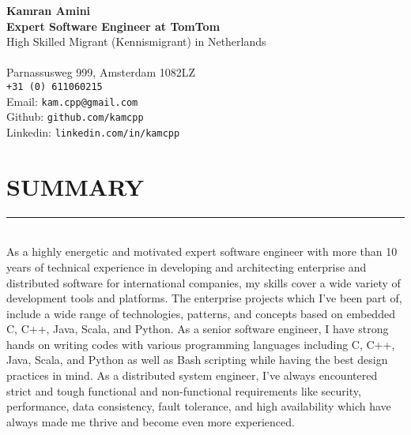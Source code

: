 \documentclass[10pt,a4paper]{article}
\begin{document}
\noindent \textbf{Kamran Amini} \\
\noindent \small \textbf{Expert Software Engineer at TomTom} \\
\noindent \small High Skilled Migrant (Kennismigrant) in Netherlands \\ \\
Parnassusweg 999, Amsterdam 1082LZ \\
\texttt{+31 (0) 611060215} \\
Email: \texttt{kam.cpp@gmail.com} \\
Github: \texttt{github.com/kamcpp} \\
Linkedin: \texttt{linkedin.com/in/kamcpp} 

\section{SUMMARY}
\noindent \rule {18.0cm}{0.2pt} \\
\normalsize As a highly energetic and motivated expert software engineer with more than 10 years of technical experience in developing and architecting enterprise and distributed software for international companies, my skills cover a wide variety of development tools and platforms. The enterprise projects which I've been part of, include a wide range of technologies, patterns, and concepts based on embedded C, C++, Java, Scala, and Python. As a senior software engineer, I have strong hands on writing codes with various programming languages including C, C++, Java, Scala, and Python as well as Bash scripting while having the best design practices in mind. As a distributed system engineer, I've always encountered strict and tough functional and non-functional requirements like security, performance, data consistency, fault tolerance, and high availability which have always made me thrive and become even more experienced.

\small
\end{document}
